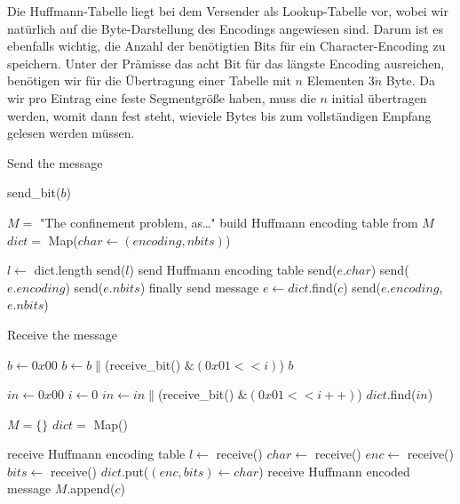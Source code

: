 Die Huffmann-Tabelle liegt bei dem Versender als Lookup-Tabelle vor, wobei wir
natürlich auf die Byte-Darstellung des Encodings angewiesen sind. Darum ist es
ebenfalls wichtig, die Anzahl der benötigtien Bits für ein Character-Encoding zu
speichern. Unter der Prämisse das acht Bit für das längste Encoding ausreichen,
benötigen wir für die Übertragung einer Tabelle mit $n$ Elementen $3 \dot n$
Byte. Da wir pro Eintrag eine feste Segmentgröße haben, muss die $n$ initial
übertragen werden, womit dann fest steht, wieviele Bytes bis zum vollständigen
Empfang gelesen werden müssen.

\begin{algorithm}
\caption{Send the message}
\begin{algorithmic}
        \State send\_bit($b$)
    \EndFor

\EndFunction

\State $M =$ "The confinement problem, as\ldots"
\Comment build Huffmann encoding table from $M$
\State $dict = $ Map($char \gets (encoding,nbits)$)

\State $l \gets $ dict.length
\State send($l$)
\Comment send Huffmann encoding table
    \State send($e.char$)
    \State send($e.encoding$)
    \State send($e.nbits$)
\EndFor
\Comment finally send message
    \State $e \gets dict$.find($c$)
    \State send($e.encoding$, $e.nbits$)
\EndFor
\end{algorithmic}
\end{algorithm}

\begin{algorithm}
\caption{Receive the message}
\begin{algorithmic}

    \State $b \gets 0x00$
        \State $b \gets b \| $(receive\_bit() $\& (0x01 << i)$)
    \EndFor
    \State \Return $b$
\EndFunction

    \State $in \gets 0x00$
    \State $i \gets 0$
    \Repeat
        \State $in \gets in \| $(receive\_bit() $\& (0x01 << i++)$)
    \State \Return $dict$.find($in$)
\EndFunction


\State $M = \{\}$
\State $dict = $ Map()

\Comment receive Huffmann encoding table
\State $l \gets $ receive()
    \State $char \gets$ receive()
    \State $enc \gets$ receive()
    \State $bits \gets$ receive()
    \State $dict$.put($(enc,bits) \gets char$)
\EndFor
\Comment receive Huffmann encoded message
    \State $M$.append($c$)
\EndFor
\end{algorithmic}
\end{algorithm}


